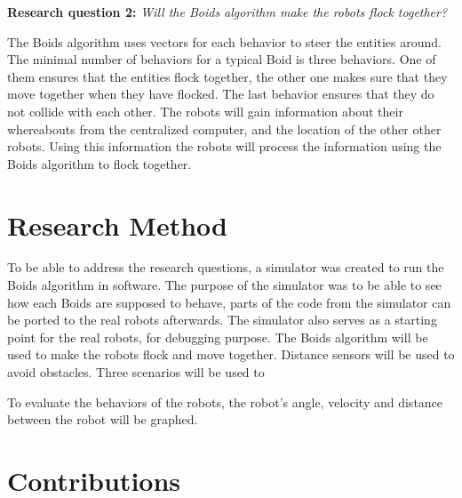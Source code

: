 \textbf{Research question 2:} {\it Will the Boids algorithm make the robots flock together?}

The Boids algorithm uses vectors for each behavior to steer the entities around. The minimal number of behaviors for a typical Boid is three behaviors. One of them ensures that the entities flock together, the other one makes sure that they move together when they have flocked. The last behavior ensures that they do not collide with each other. The robots will gain information about their whereabouts from the centralized computer, and the location of the other other robots. Using this information the robots will process the information using the Boids algorithm to flock together.


\section{Research Method}
\label{sec:researchMethod}
To be able to address the research questions, a simulator was created to run the Boids algorithm in software. The purpose of the simulator was to be able to see how each Boids are supposed to behave, parts of the code from the simulator can be ported to the real robots afterwards. The simulator also serves as a starting point for the real robots, for debugging purpose.
The Boids algorithm will be used to make the robots flock and move together. Distance sensors will be used to avoid obstacles.
Three scenarios will be used to 

To evaluate the behaviors of the robots, the robot's angle, velocity and distance between the robot will be graphed. 

\section{Contributions}
\label{sec:IntroContributions}



